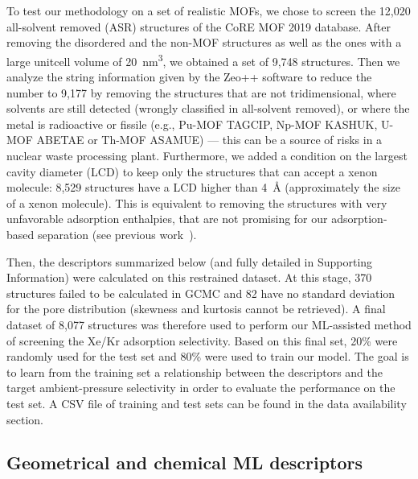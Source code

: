\documentclass[main]{subfiles}
\begin{document}
To test our methodology on a set of realistic MOFs, we chose to screen the 12,020 all-solvent removed (ASR) structures of the CoRE MOF 2019 database\cite{Chung_2019}. After removing the disordered and the non-MOF structures as well as the ones with a large unitcell volume of \SI{20}{\cubic\nano\meter}, we obtained a set of 9,748 structures. Then we analyze the string information given by the Zeo++ software\cite{zeopp_Willems2012} to reduce the number to 9,177 by removing the structures that are not tridimensional, where solvents are still detected (wrongly classified in all-solvent removed), or where the metal is radioactive or fissile (e.g., Pu-MOF TAGCIP\cite{Diwu_2010}, Np-MOF KASHUK\cite{Martin_2017}, U-MOF ABETAE\cite{Jouffret_2011} or Th-MOF ASAMUE\cite{Liang_2016}) --- this can be a source of risks in a nuclear waste processing plant. Furthermore, we added a condition on the largest cavity diameter (LCD) to keep only the structures that can accept a xenon molecule: 8,529 structures have a LCD higher than \SI{4}{\angstrom} (approximately the size of a xenon molecule). This is equivalent to removing the structures with very unfavorable adsorption enthalpies, that are not promising for our adsorption-based separation (see previous work~\cite{Ren_2023}).

Then, the descriptors summarized below (and fully detailed in Supporting Information) were calculated on this restrained dataset. At this stage, 370 structures failed to be calculated in GCMC and 82 have no standard deviation for the pore distribution (skewness and kurtosis cannot be retrieved). A final dataset of 8,077 structures was therefore used to perform our ML-assisted method of screening the Xe/Kr adsorption selectivity. Based on this final set, {20\%} were randomly used for the test set and {80\%} were used to train our model. The goal is to learn from the training set a relationship between the descriptors and the target ambient-pressure selectivity in order to evaluate the performance on the test set. A CSV file of training and test sets can be found in the data availability section.

\subsection{Geometrical and chemical ML descriptors}
\end{document}
